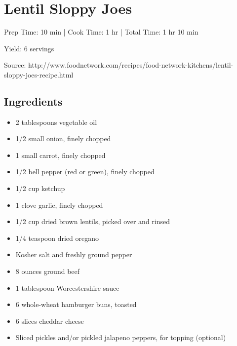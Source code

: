 \section{Lentil Sloppy Joes}

\begin{center}
Prep Time: 10 min |
Cook Time: 1 hr |
Total Time: 1 hr 10 min

\noindent Yield: 6 servings

\vspace{1em}

Source: http://www.foodnetwork.com/recipes/food-network-kitchens/lentil-sloppy-joes-recipe.html
\end{center}

\subsection{Ingredients}
\begin{multicols}{2}
\begin{itemize}
    \item 2 tablespoons vegetable oil
    \item 1/2 small onion, finely chopped
    \item 1 small carrot, finely chopped
    \item 1/2 bell pepper (red or green), finely chopped
    \item 1/2 cup ketchup
    \item 1 clove garlic, finely chopped
    \item 1/2 cup dried brown lentils, picked over and rinsed
    \item 1/4 teaspoon dried oregano
    \item Kosher salt and freshly ground pepper
    \item 8 ounces ground beef
    \item 1 tablespoon Worcestershire sauce
    \item 6 whole-wheat hamburger buns, toasted
    \item 6 slices cheddar cheese
    \item Sliced pickles and/or pickled jalapeno peppers, for topping (optional)
\end{itemize}
\end{multicols}

